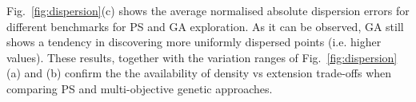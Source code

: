 Fig.~\ref{fig:dispersion}(c) shows the average normalised absolute
dispersion errors for different benchmarks for PS and GA
exploration. As it can be observed, GA still shows a tendency in
discovering more uniformly dispersed points (i.e. higher values). These results,
together with the variation ranges of Fig.~\ref{fig:dispersion}(a) and
(b) confirm the the availability of density vs extension trade-offs
when comparing PS and multi-objective genetic approaches.

